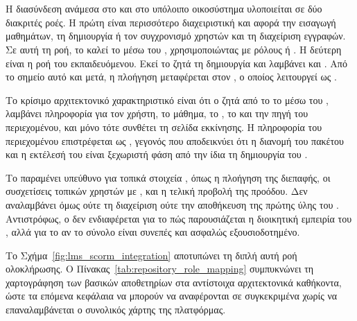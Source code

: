 \section{}
\label{sec:lms_scorm_integration}

Η διασύνδεση ανάμεσα στο  και στο υπόλοιπο οικοσύστημα υλοποιείται σε δύο διακριτές ροές. Η πρώτη είναι περισσότερο διαχειριστική και αφορά την εισαγωγή μαθημάτων, τη δημιουργία ή τον συγχρονισμό χρηστών και τη διαχείριση εγγραφών. Σε αυτή τη ροή, το  καλεί το  μέσω του , χρησιμοποιώντας   με ρόλους  ή . Η δεύτερη είναι η  ροή του εκπαιδευόμενου. Εκεί το  ζητά τη δημιουργία  και λαμβάνει \texttt{} και \texttt{}. Από το σημείο αυτό και μετά, η πλοήγηση μεταφέρεται στον , ο οποίος λειτουργεί ως .

Το κρίσιμο αρχιτεκτονικό χαρακτηριστικό είναι ότι ο  ζητά από το  το  μέσω του \texttt{}, λαμβάνει πληροφορία για τον χρήστη, το μάθημα, το \texttt{}, το \texttt{} και την πηγή του περιεχομένου, και μόνο τότε συνθέτει τη σελίδα εκκίνησης. Η πληροφορία του περιεχομένου επιστρέφεται ως , γεγονός που αποδεικνύει ότι η διανομή του πακέτου και η εκτέλεσή του είναι ξεχωριστή φάση από την ίδια τη δημιουργία του .

Το  παραμένει υπεύθυνο για τοπικά στοιχεία , όπως η πλοήγηση της διεπαφής, οι συσχετίσεις τοπικών χρηστών με , και η τελική προβολή της προόδου. Δεν αναλαμβάνει όμως ούτε τη διαχείριση  ούτε την αποθήκευση της πρώτης ύλης του . Αντιστρόφως, ο  δεν ενδιαφέρεται για το πώς παρουσιάζεται η διοικητική εμπειρία του , αλλά για το αν το σύνολο  είναι συνεπές και ασφαλώς εξουσιοδοτημένο.


Το Σχήμα~\ref{fig:lms_scorm_integration} αποτυπώνει τη διπλή αυτή ροή ολοκλήρωσης. Ο Πίνακας~\ref{tab:repository_role_mapping} συμπυκνώνει τη χαρτογράφηση των βασικών αποθετηρίων στα αντίστοιχα αρχιτεκτονικά καθήκοντα, ώστε τα επόμενα κεφάλαια να μπορούν να αναφέρονται σε συγκεκριμένα  χωρίς να επαναλαμβάνεται ο συνολικός χάρτης της πλατφόρμας.



\begin{table}[H]
\centering
\caption{Χαρτογράφηση αποθετηρίων και αρχιτεκτονικών ρόλων του υλοποιημένου οικοσυστήματος}
\label{tab:repository_role_mapping}

\end{table}
